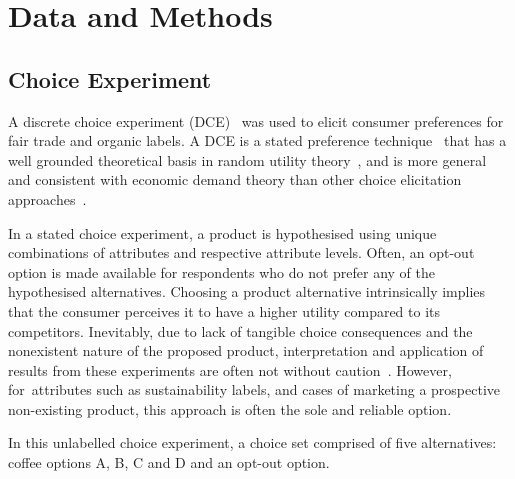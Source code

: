 \documentclass[sustainability,article,accept,moreauthors,pdftex,10pt,a4paper]{Definitions/mdpi}
\theoremstyle{mdpi}
\newcounter{ex}
\newcounter{re}
\theoremstyle{mdpidefinition}
\begin{document}
\section{Data and Methods \label{mdata}}
\unskip
\subsection{Choice Experiment \label{choice}}
\par{A discrete choice experiment (DCE)~\cite{Train2009} was used to elicit consumer preferences for fair trade and organic labels. A DCE is a stated preference technique~\cite{Louviere1982, louviere1983} that has a well grounded theoretical basis in random utility theory~\cite{Hanley1998}, and is more general and consistent with economic demand theory than other choice elicitation approaches~\cite{Louviere2010}.}
\par{In a stated choice experiment, a product is hypothesised using unique combinations of attributes and respective attribute levels. Often, an opt-out option is made available for respondents who do not prefer any of the hypothesised alternatives. Choosing a product alternative intrinsically implies that the consumer perceives it to have a higher utility compared to its competitors. Inevitably, due to lack of tangible choice consequences and the nonexistent nature of the proposed product, interpretation and application of results from these experiments are often not without caution~\cite{List2001}. However, for~attributes such as sustainability labels, and cases of marketing a prospective non-existing product, this approach is often the sole and reliable option.}
\par{In this unlabelled choice experiment, a choice set comprised of five alternatives: coffee options A, B, C and D and an opt-out option.}
\end{document}
